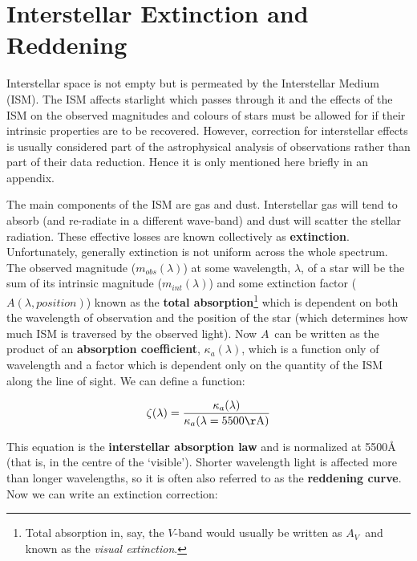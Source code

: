 \documentclass[twoside,11pt,nolof]{starlink}
\begin{document}
\newpage
\appendix
{}

\section{\label{INTERSTELLAR}Interstellar Extinction
and Reddening}

Interstellar space is not empty but is permeated by the Interstellar
Medium (ISM).  The ISM affects starlight which passes through it and
the effects of the ISM on the observed magnitudes and colours of stars
must be allowed for if their intrinsic properties are to be recovered.
However, correction for interstellar effects is usually considered part of
the astrophysical analysis of observations rather than part of their data
reduction.  Hence it is only mentioned here briefly in an appendix.

The main components of the ISM are gas and dust.  Interstellar gas will
tend to absorb (and re-radiate in a different wave-band) and dust will
scatter the stellar radiation. These effective losses are known
collectively as \textbf{extinction}. Unfortunately, generally extinction is
not uniform across the whole spectrum.  The observed magnitude
($m_{obs}(\lambda)$) at some wavelength, $\lambda$, of a star will be
the sum of its intrinsic magnitude ($m_{int}(\lambda)$) and some
extinction factor ($A(\lambda , position)$) known as the \textbf{total
absorption}\footnote{Total absorption in, say, the $V$-band would usually
be written as ${A_V}$\, and known as the \textit{visual extinction}.} which is
dependent on both the wavelength of observation and the position of the
star (which determines how much ISM is traversed by the observed light).
Now $A$\, can be written as the product of an \textbf{absorption coefficient},
$\kappa_a(\lambda)$, which is a function only of wavelength and a
factor which is dependent only on the quantity of the ISM along the
line of sight. We can define a function:

\begin{equation}
  \zeta (\lambda) = \frac{\kappa_a (\lambda)}{\kappa_a (\lambda=5500
   {\rm \AA)}}
\end{equation}

%

This equation is the \textbf{interstellar absorption law} and is normalized at
5500\AA~ (that is, in the centre of the `visible').  Shorter wavelength
light is affected more than longer wavelengths, so it is often also
referred to as the \textbf{reddening curve}. Now we can write an extinction
correction:
\end{document}
